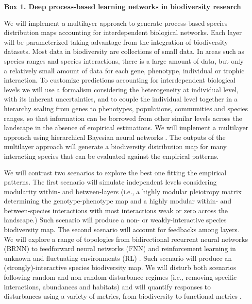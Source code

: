 \documentclass[twocolumn]{article}
\begin{document}
\begin{mybox}\begin{singlespace}
{\bf{Box 1. Deep process-based learning networks in biodiversity research}}\\
\begin{small}
  We will implement a multilayer approach to generate process-based
  species distribution maps accounting for interdependent biological
  networks. Each layer will be parameterized taking advantage from the
  integration of biodiversity datasets. Most data in biodiversity are
  collections of small data. In areas such as species ranges and
  species interactions, there is a large amount of data, but only a
  relatively small amount of data for each gene, phenotype, individual
  or trophic interaction. To customize predictions accounting for
  interdependent biological levels we will use a formalism considering
  the heterogeneity at individual level, with its inherent
  uncertainties, and to couple the individual level together in a
  hierarchy scaling from genes to phenotypes, populations, communities
  and species ranges, so that information can be borrowed from other
  similar levels across the landscape in the absence of empirical
  estimations. We will implement a multilayer approach using
  hierarchical Bayesian neural networks \cite{Ghahramani:2015}. The outputs of the
  multilayer approach will generate a biodiversity distribution map
  for many interacting species that can be evaluated against the
  empirical patterns.

  We will contrast two scenarios to explore the best one fitting the
  empirical patterns. The first scenario will simulate independent
  levels considering modularity within- and between-layers (i.e., a
  highly modular pleiotropy matrix determining the genotype-phenotype
  map and a highly modular within- and between-species interactions
  with most interactions weak or zero across the landscape.) Such
  scenario will produce a non- or weakly-interactive species
  biodiversity map. The second scenario will account for feedbacks
  among layers. We will explore a range of topologies from
  bidirectional recurrent neural networks (BRNN) to feedforward neural
  networks (FNN) and reinforcement learning in unknown and fluctuating
  environments (RL) \cite{Schmidhuber:2015}. Such scenario will produce an (strongly)-interactive
  species biodiversity map. We will disturb both scenarios following
  random and non-random disturbance regimes (i.e., removing specific
  interactions, abundances and habitats) and will quantify responses
  to disturbances using a variety of metrics, from biodiversity to
  functional metrics \cite{Melian2018}.
\end{small}
\end{singlespace}
\end{mybox}
\end{document}

